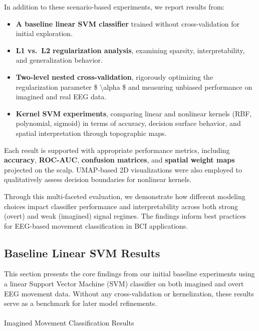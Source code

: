 \documentclass[
  letterpaper,
  DIV=11,
  numbers=noendperiod]{scrartcl}
\makeatletter
\let\oldparagraph\paragraph
\renewcommand{\paragraph}{
    \@ifstar
      \xxxParagraphStar
      \xxxParagraphNoStar
  }
\newcommand{\xxxParagraphStar}[1]{\oldparagraph*{#1}\mbox{}}
\newcommand{\xxxParagraphNoStar}[1]{\oldparagraph{#1}\mbox{}}
\providecommand{\tightlist}{%
  \setlength{\itemsep}{0pt}\setlength{\parskip}{0pt}}\usepackage{longtable,booktabs,array}
\makeatother
\begin{document}
In addition to these scenario-based experiments, we report results from:

\begin{itemize}
\tightlist
\item
  \textbf{A baseline linear SVM classifier} trained without
  cross-validation for initial exploration.
\item
  \textbf{L1 vs.~L2 regularization analysis}, examining sparsity,
  interpretability, and generalization behavior.
\item
  \textbf{Two-level nested cross-validation}, rigorously optimizing the
  regularization parameter \$ \textbackslash alpha \$ and measuring
  unbiased performance on imagined and real EEG data.
\item
  \textbf{Kernel SVM experiments}, comparing linear and nonlinear
  kernels (RBF, polynomial, sigmoid) in terms of accuracy, decision
  surface behavior, and spatial interpretation through topographic maps.
\end{itemize}

Each result is supported with appropriate performance metrics, including
\textbf{accuracy}, \textbf{ROC-AUC}, \textbf{confusion matrices}, and
\textbf{spatial weight maps} projected on the scalp. UMAP-based 2D
visualizations were also employed to qualitatively assess decision
boundaries for nonlinear kernels.

Through this multi-faceted evaluation, we demonstrate how different
modeling choices impact classifier performance and interpretability
across both strong (overt) and weak (imagined) signal regimes. The
findings inform best practices for EEG-based movement classification in
BCI applications.

\subsection{Baseline Linear SVM
Results}\label{baseline-linear-svm-results}

This section presents the core findings from our initial baseline
experiments using a linear Support Vector Machine (SVM) classifier on
both imagined and overt EEG movement data. Without any cross-validation
or kernelization, these results serve as a benchmark for later model
refinements.

\paragraph{Imagined Movement Classification
Results}\label{imagined-movement-classification-results}
\end{document}
